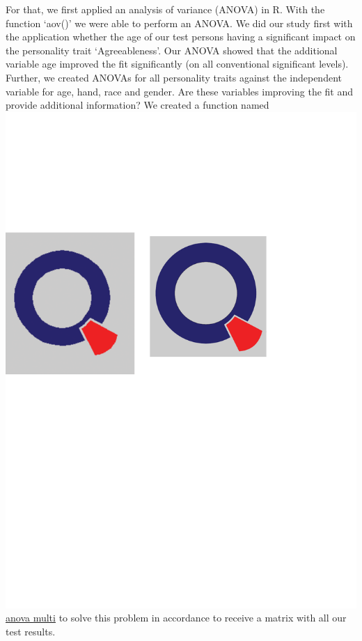 \newline \newline
For that, we first applied an analysis of variance (ANOVA) in R. With the function `aov()' we were able to perform an ANOVA. We did our study first with the application whether the age of our test persons having a significant impact on the personality trait `Agreeableness'. Our ANOVA showed that the additional variable age improved the fit significantly (on all conventional significant levels). 
\newline \newline
Further, we created ANOVAs for all personality traits against the independent variable for age, hand, race and gender. Are these variables improving the fit and provide additional information?
\newline \newline
We created a function named \href{https://github.com/Matthias2193/SPL/blob/40438376a983799102d15acb98bdd9a0a98a6889/Big5VarianceAnalysis/VarianceAnalysis.R#L13-L26}{\includegraphics[scale = 0.06]{Figures/qletlogo.pdf}anova\underline{ }multi} to solve this problem in accordance to receive a matrix with all our test results.

